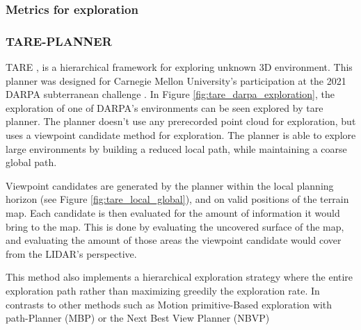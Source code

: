 \documentclass[11pt]{article}
\begin{document}
        \subsubsection{Metrics for exploration}
        \subsubsection{TARE-PLANNER}

        TARE \cite{tare}, is a hierarchical framework for exploring unknown 3D environment. This planner was designed for Carnegie Mellon University's participation at the 2021 DARPA subterranean challenge \cite{darpa_subterranean_challenge}. In Figure \ref{fig:tare_darpa_exploration}, the exploration of one of DARPA's environments  can be seen explored by tare planner. The planner doesn't use any prerecorded point cloud for exploration, but uses a viewpoint candidate method for exploration. The planner is able to explore large environments by building a reduced local path, while maintaining a coarse global path.

        Viewpoint candidates are generated by the planner within the local planning horizon (see Figure \ref{fig:tare_local_global}), and on valid positions of the terrain map. Each candidate is then evaluated for the amount of information it would bring to the map. This is done by evaluating the uncovered surface of the map, and evaluating the amount of those areas the viewpoint candidate would cover from the LIDAR's perspective.  

        This method also implements a hierarchical exploration strategy where the entire exploration path rather than maximizing greedily the exploration rate. In contrasts to other methods such as Motion primitive-Based exploration with path-Planner (MBP) \cite{dharmadhikari2020motion} or the Next Best View Planner (NBVP) \cite{bircher2016receding}
\end{document}
